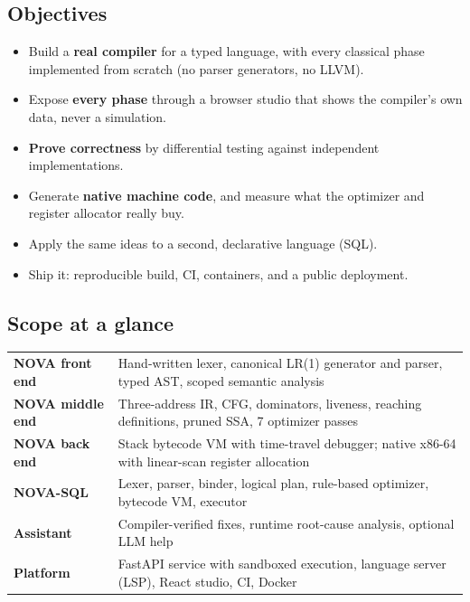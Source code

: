 \documentclass[11pt,a4paper]{article}
\begin{document}
\subsection{Objectives}
\begin{itemize}
\item Build a \textbf{real compiler} for a typed language, with every classical phase implemented from scratch (no parser generators, no LLVM).
\item Expose \textbf{every phase} through a browser studio that shows the compiler's own data, never a simulation.
\item \textbf{Prove correctness} by differential testing against independent implementations.
\item Generate \textbf{native machine code}, and measure what the optimizer and register allocator really buy.
\item Apply the same ideas to a second, declarative language (SQL).
\item Ship it: reproducible build, CI, containers, and a public deployment.
\end{itemize}

\subsection{Scope at a glance}
\begin{center}\small
\begin{tabularx}{\linewidth}{@{}>{\bfseries\sffamily\color{indigo}}l X@{}}\toprule
NOVA front end & Hand-written lexer, canonical LR(1) generator and parser, typed AST, scoped semantic analysis\\
NOVA middle end & Three-address IR, CFG, dominators, liveness, reaching definitions, pruned SSA, 7 optimizer passes\\
NOVA back end & Stack bytecode VM with time-travel debugger; native x86-64 with linear-scan register allocation\\
NOVA-SQL & Lexer, parser, binder, logical plan, rule-based optimizer, bytecode VM, executor\\
Assistant & Compiler-verified fixes, runtime root-cause analysis, optional LLM help\\
Platform & FastAPI service with sandboxed execution, language server (LSP), React studio, CI, Docker\\\bottomrule
\end{tabularx}
\end{center}

\end{document}
